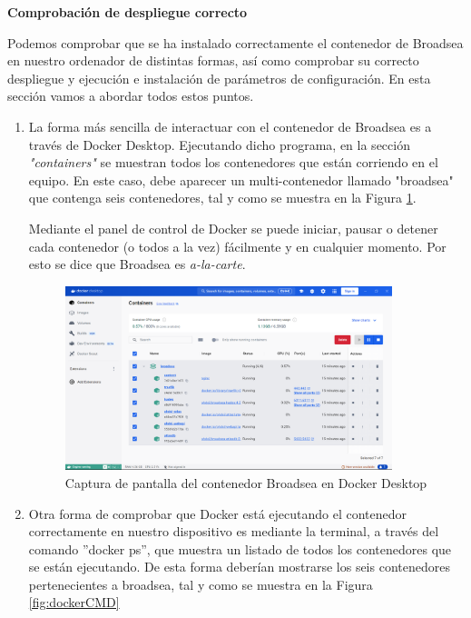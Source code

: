 \documentclass{article}
\begin{document}
\textbf{Comprobación de despliegue correcto} 

Podemos comprobar que se ha instalado correctamente el contenedor de Broadsea en nuestro ordenador de distintas formas, así como comprobar su correcto despliegue y ejecución e instalación de parámetros de configuración. En esta sección vamos a abordar todos estos puntos.

\begin{enumerate} 

    \item La forma más sencilla de interactuar con el contenedor de Broadsea es a través de Docker Desktop. Ejecutando dicho programa, en la sección \textit{"containers"} se muestran todos los contenedores que están corriendo en el equipo. En este caso, debe aparecer un multi-contenedor llamado "broadsea" que contenga seis contenedores, tal y como se muestra en la Figura \ref{fig:dockerDesktop}.
    
    Mediante el panel de control de Docker se puede iniciar, pausar o detener cada contenedor (o todos a la vez) fácilmente y en cualquier momento. Por esto se dice que Broadsea es \textit{a-la-carte}.
    
\begin{figure}[H]
    \centering
    \includegraphics[width=0.90\textwidth]{images/dockerDesktop.png}
    \caption{Captura de pantalla del contenedor Broadsea en Docker Desktop}
    \label{fig:dockerDesktop}
\end{figure}

    \item Otra forma de comprobar que Docker está ejecutando el contenedor correctamente en nuestro dispositivo es mediante la terminal, a través del comando ''docker ps'', que muestra un listado de todos los contenedores que se están ejecutando. De esta forma deberían mostrarse los seis contenedores pertenecientes a broadsea, tal y como se muestra en la Figura \ref{fig:dockerCMD}


\end{enumerate}
\end{document}
